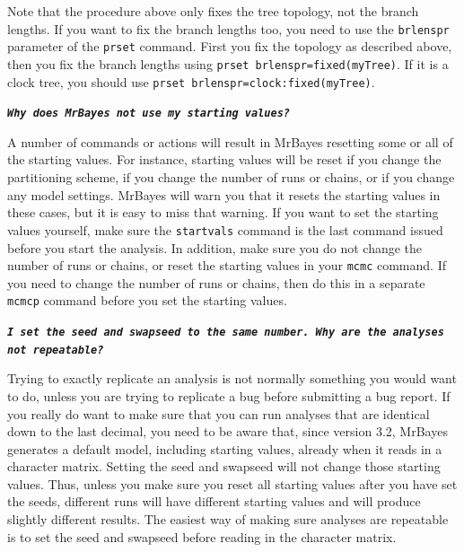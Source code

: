 \documentclass[12pt]{book}
\newcommand{\ttt}[1]{\texttt{#1}}
\newcommand{\tb}[1]{\ttt{\textbf{#1}}}
\begin{document}
Note that the procedure above only fixes the tree topology, not the branch lengths. If you want to
fix the branch lengths too, you need to use the \ttt{brlenspr} parameter of the \ttt{prset}
command. First you fix the topology as described above, then you fix the branch lengths using
\ttt{prset brlenspr=fixed(myTree)}. If it is a clock tree, you should use \ttt{prset
brlenspr=clock:fixed(myTree)}.

\tb{\it{Why does MrBayes not use my starting values?}}

A number of commands or actions will result in MrBayes resetting some or all of the starting
values. For instance, starting values will be reset if you change the partitioning scheme, if you
change the number of runs or chains, or if you change any model settings. MrBayes will warn you
that it resets the starting values in these cases, but it is easy to miss that warning. If you want
to set the starting values yourself, make sure the \ttt{startvals} command is the last command
issued before you start the analysis. In addition, make sure you do not change the number of runs
or chains, or reset the starting values in your \ttt{mcmc} command. If you need to change the
number of runs or chains, then do this in a separate \ttt{mcmcp} command before you set the
starting values.

\tb{\it{I set the seed and swapseed to the same number. Why are the analyses not repeatable?}}

Trying to exactly replicate an analysis is not normally something you would want to do, unless you
are trying to replicate a bug before submitting a bug report. If you really do want to make sure
that you can run analyses that are identical down to the last decimal, you need to be aware that,
since version 3.2, MrBayes generates a default model, including starting values, already when it
reads in a character matrix. Setting the seed and swapseed will not change those starting values.
Thus, unless you make sure you reset all starting values after you have set the seeds, different
runs will have different starting values and will produce slightly different results. The easiest
way of making sure analyses are repeatable is to set the seed and swapseed before reading in the
character matrix.
\end{document}
